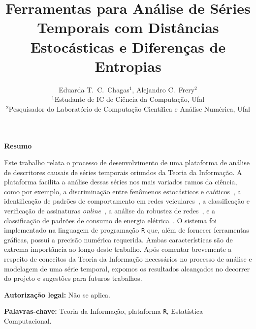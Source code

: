 \documentclass[12pt]{article}
\title{\large \textbf{Ferramentas para Análise de Séries Temporais com Distâncias Estocásticas e Diferenças de Entropias}}
\author{\myfont Eduarda T.\ C.\ Chagas$^{1}$, Alejandro C.\ Frery$^{2}$\\
    \myfont $^{1}$Estudante de IC de Ciência da Computação, Ufal\\
    \myfont $^{2}$Pesquisador do Laboratório de Computação Científica e Análise Numérica, Ufal}
\date{}
\begin{document}
\raggedright
\maketitle
\thispagestyle{empty}
\pagestyle{empty}

\textbf{Resumo}

Este trabalho relata o processo de desenvolvimento de uma plataforma de análise de descritores causais de séries temporais oriundos da Teoria da Informação.
A plataforma facilita a análise dessas séries nos mais variados ramos da ciência, como por exemplo, a discriminação entre fenômenos estocásticos e caóticos~\cite{DistinguishingNoiseFromChaos}, a identificação de padrões de comportamento em redes veiculares~\cite{CharacterizationVehicleBehaviorInformationTheory}, a classificação e verificação de assinaturas \textit{online}~\cite{ClassificationVerificationOnlineHandwrittenSignatures}, a análise da robustez de redes~\cite{InformationTheoryPerspectiveNetworkRobustness}, e a classificação de padrões de consumo de energia elétrica~\cite{CharacterizationElectricLoadInformationTheoryQuantifiers}.
O sistema foi implementado na linguagem de programação \texttt R que, além de fornecer ferramentas gráficas, possui a precisão numérica requerida. 
Ambas características são de extrema importância ao longo deste trabalho.
Após comentar brevemente a respeito de conceitos da Teoria da Informação necessários no processo de análise e modelagem de uma série temporal, expomos os resultados alcançados no decorrer do projeto e sugestões para futuros trabalhos.

\textbf{Autorização legal:} Não se aplica.

\textbf{Palavras-chave:} Teoria da Informação, plataforma \texttt R, Estatística Computacional.
\end{document}
